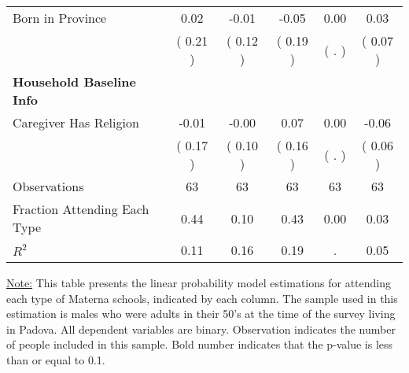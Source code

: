 \begin{table}[H]
{\begin{tabular}{lccccc}
\quad Born in Province &      0.02 &     -0.01 &     -0.05 &      0.00 &      0.03 \\
\quad  & (     0.21 ) & (     0.12 )  & (     0.19 )  & (        . ) & (     0.07 ) \\
\midrule
\textbf{Household Baseline Info} \\
\quad Caregiver Has Religion &     -0.01 &     -0.00 &      0.07 &      0.00 &     -0.06 \\
\quad  & (     0.17 ) & (     0.10 )  & (     0.16 )  & (        . ) & (     0.06 ) \\
\midrule
Observations & 63 & 63 & 63 & 63 & 63 \\
Fraction Attending Each Type &      0.44 &      0.10 &      0.43 &      0.00 &      0.03 \\
\midrule
$ R^2$ &      0.11 &      0.16 &      0.19 &         . &      0.05 \\
\bottomrule
\end{tabular}}
\end{table}
\begin{footnotesize}
\noindent\underline{Note:} This table presents the linear probability model estimations for attending each type of Materna schools, indicated by each column. The sample used in this estimation is males who were adults in their 50's at the time of the survey living in Padova. All dependent variables are binary. Observation indicates the number of people included in this sample. Bold number indicates that the p-value is less than or equal to 0.1.
\end{footnotesize}
